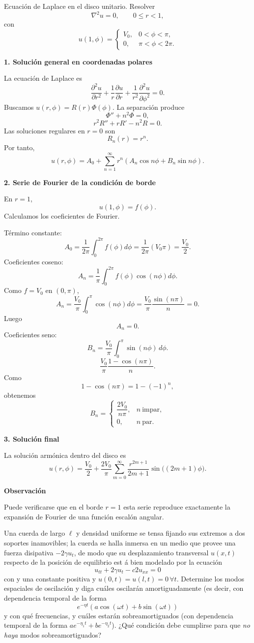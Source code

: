 \documentclass[11pt,spanish]{article}
\newcounter{problema}
\newcommand{\prob}{\stepcounter{problema} \vspace{.5cm} \noindent{\bf Problema \arabic{problema}: }}
\begin{document}
Ecuación de Laplace en el disco unitario.
Resolver
$$
\nabla^2u=0,
\qquad 0\le r<1,
$$
con
$$
u(1,\phi)=
\begin{cases}
V_0,&0<\phi<\pi,\\
0,&\pi<\phi<2\pi.
\end{cases}
$$

{\bf 1. Solución general en coordenadas polares}

La ecuación de Laplace es
$$
\frac{\partial^2u}{\partial r^2}
+\frac1r\frac{\partial u}{\partial r}
+\frac1{r^2}\frac{\partial^2u}{\partial\phi^2}=0.
$$
Buscamos $u(r,\phi)=R(r)\Phi(\phi)$.
La separación produce
$$
\Phi''+n^2\Phi=0,
$$
$$
r^2R''+rR'-n^2R=0.
$$
Las soluciones regulares en $r=0$ son
$$
R_n(r)=r^n.
$$
Por tanto,
$$
u(r,\phi)
=
A_0
+\sum_{n=1}^{\infty}
r^n
\left(
A_n\cos n\phi
+
B_n\sin n\phi
\right).
$$

{\bf 2. Serie de Fourier de la condición de borde}

En $r=1$,
$$
u(1,\phi)=f(\phi).
$$
Calculamos los coeficientes de Fourier.

Término constante:
$$
A_0
=
\frac1{2\pi}
\int_0^{2\pi}f(\phi)d\phi
=
\frac1{2\pi}(V_0\pi)
=
\frac{V_0}{2}.
$$
Coeficientes coseno:
$$
A_n
=
\frac1\pi
\int_0^{2\pi}
f(\phi)\cos(n\phi)d\phi.
$$
Como $f=V_0$ en $(0,\pi)$,
$$
A_n
=
\frac{V_0}{\pi}
\int_0^\pi \cos(n\phi)d\phi
=
\frac{V_0}{\pi}
\frac{\sin(n\pi)}{n}
=
0.
$$
Luego
$$
\boxed{A_n=0.}
$$
Coeficientes seno:
$$
B_n
=
\frac{V_0}{\pi}
\int_0^\pi
\sin(n\phi)\,d\phi.
$$
$$
\frac{V_0}{\pi}
\frac{1-\cos(n\pi)}{n}.
$$
Como
$$
1-\cos(n\pi)
=
1-(-1)^n,
$$
obtenemos
$$
B_n=
\begin{cases}
\dfrac{2V_0}{n\pi},&n\ \text{impar},\\
0,&n\ \text{par}.
\end{cases}
$$

{\bf 3. Solución final}

La solución armónica dentro del disco es
$$
\boxed{
u(r,\phi)
=
\frac{V_0}{2}
+
\frac{2V_0}{\pi}
\sum_{m=0}^{\infty}
\frac{r^{2m+1}}{2m+1}
\sin\big((2m+1)\phi\big).
}
$$

{\bf Observación}

Puede verificarse que en el borde $r=1$ esta serie reproduce exactamente la expansión de Fourier de una función escalón angular.



\prob Una cuerda de largo $\ell$ y densidad uniforme se tensa fijando sus extremos a dos soportes
inamovibles; la cuerda se halla inmersa en un medio que provee una fuerza disipativa $-2\gamma u_t$, de modo que su desplazamiento transversal $u(x,t)$ respecto de la posición de equilibrio est á bien modelado por la ecuación
$$
u_{tt} + 2\gamma u_t - c2u_{xx} = 0
$$
con y una constante positiva y
$u(0,t) = u(l,t) = 0\, \forall t$. 
Determine los modos espaciales de oscilación y diga cuáles oscilarán amortiguadamente (es decir, con dependencia temporal de la forma
$$
e^{-\eta t}
(a\cos (\omega t)+b\sin(\omega t))
$$
y con qué frecuencias, y cuáles estarán sobreamortiguados (con dependencia temporal de la forma $ae^{-\eta_1 t}+be^{-\eta_2 t}$). ¿Qué condición debe cumplirse para que {\em no haya} modos sobreamortiguados?
\end{document}
